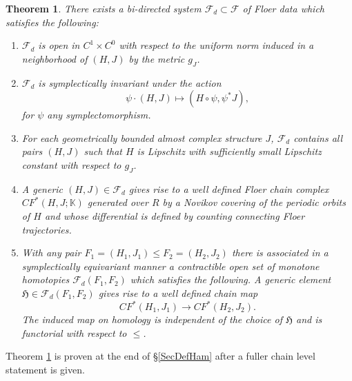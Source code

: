 \documentclass[11pt]{amsart}
\newcommand{\K}{\mathbb{K}}
\newtheorem{tm}{Theorem}[section]
\theoremstyle{definition}
\theoremstyle{remark}
\begin{document}

\begin{tm}\label{mainTmA}
There exists a bi-directed system $\mathcal{F}_d\subset\mathcal{F}$ of Floer data which satisfies the following:
\begin{enumerate}
\item
$\mathcal{F}_d$ is open in $C^1\times C^0$ with respect to the uniform norm induced in a neighborhood of $(H,J)$ by the metric $g_J$.
\item
$\mathcal{F}_d$ is symplectically invariant under the action \[
\psi\cdot(H,J)\mapsto (H\circ\psi,\psi^*J),
\]
for $\psi$ \textit{any} symplectomorphism.
\item \label{mainTmA:itC}For each geometrically bounded almost complex structure $J$, $\mathcal{F}_d$ contains all pairs $(H,J)$ such that $H$ is Lipschitz with sufficiently small Lipschitz constant with respect to $g_J$.
\item A generic $(H,J)\in\mathcal{F}_d$ gives rise to a well defined Floer chain complex $CF^*(H,J;\K)$ generated over $R$ by a Novikov covering of the periodic orbits of $H$ and whose differential is defined by counting connecting Floer trajectories.
\item \label{MainTmAPartE}With any pair $F_1=(H_1,J_1)\leq F_2=(H_2,J_2)$ there is associated in a symplectically equivariant manner a contractible open set of monotone homotopies $\mathcal{F}_d(F_1,F_2)$ which satisfies the following. A generic element $\mathfrak{H}\in \mathcal{F}_d(F_1,F_2)$ gives rise to a well defined chain map
    \[
    CF^*(H_1,J_1)\to CF^*(H_2,J_2).
    \]
    The induced map on homology is independent of the choice of $\mathfrak{H}$ and is functorial with respect to $\leq$.
    \end{enumerate}
\end{tm}
Theorem \ref{mainTmA} is proven at the end of \S\ref{SecDefHam} after a fuller chain level statement is given.
\end{document}
